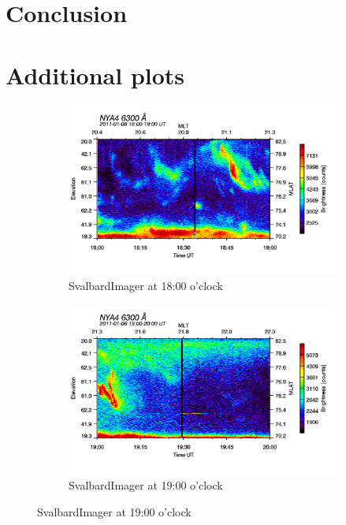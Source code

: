 \documentclass[10pt,a4paper]{article}
\begin{document}
\section{Conclusion}




\newpage
\section{Additional plots}

\begin{figure}[h]
\centering
\begin{subfigure}{0.3\textwidth}
\centering
	\includegraphics[width=\textwidth]{SvalbardImager6300A18.png}
	\caption{ SvalbardImager at 18:00 o'clock \label{SBI_6_18}}
\end{subfigure}
\begin{subfigure}{0.3\textwidth}
\centering
	\includegraphics[width=\textwidth]{SvalbardImager6300A19.png}
	\caption{ SvalbardImager at 19:00 o'clock \label{SBI_6_19}}

\end{subfigure}
\end{figure}
\end{document}
